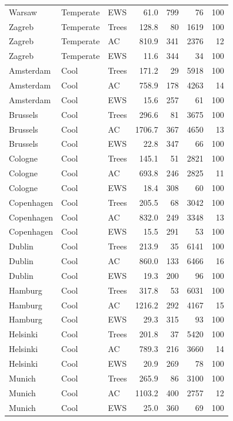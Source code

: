 \begin{table}[ht]
\begin{tabular}{lllrrrr}
  Warsaw & Temperate & EWS & 61.0 & 799 & 76 & 100 \\ 
  Zagreb & Temperate & Trees & 128.8 & 80 & 1619 & 100 \\ 
  Zagreb & Temperate & AC & 810.9 & 341 & 2376 & 12 \\ 
  Zagreb & Temperate & EWS & 11.6 & 344 & 34 & 100 \\ 
  Amsterdam & Cool & Trees & 171.2 & 29 & 5918 & 100 \\ 
  Amsterdam & Cool & AC & 758.9 & 178 & 4263 & 14 \\ 
  Amsterdam & Cool & EWS & 15.6 & 257 & 61 & 100 \\ 
  Brussels & Cool & Trees & 296.6 & 81 & 3675 & 100 \\ 
  Brussels & Cool & AC & 1706.7 & 367 & 4650 & 13 \\ 
  Brussels & Cool & EWS & 22.8 & 347 & 66 & 100 \\ 
  Cologne & Cool & Trees & 145.1 & 51 & 2821 & 100 \\ 
  Cologne & Cool & AC & 693.8 & 246 & 2825 & 11 \\ 
  Cologne & Cool & EWS & 18.4 & 308 & 60 & 100 \\ 
  Copenhagen & Cool & Trees & 205.5 & 68 & 3042 & 100 \\ 
  Copenhagen & Cool & AC & 832.0 & 249 & 3348 & 13 \\ 
  Copenhagen & Cool & EWS & 15.5 & 291 & 53 & 100 \\ 
  Dublin & Cool & Trees & 213.9 & 35 & 6141 & 100 \\ 
  Dublin & Cool & AC & 860.0 & 133 & 6466 & 16 \\ 
  Dublin & Cool & EWS & 19.3 & 200 & 96 & 100 \\ 
  Hamburg & Cool & Trees & 317.8 & 53 & 6031 & 100 \\ 
  Hamburg & Cool & AC & 1216.2 & 292 & 4167 & 15 \\ 
  Hamburg & Cool & EWS & 29.3 & 315 & 93 & 100 \\ 
  Helsinki & Cool & Trees & 201.8 & 37 & 5420 & 100 \\ 
  Helsinki & Cool & AC & 789.3 & 216 & 3660 & 14 \\ 
  Helsinki & Cool & EWS & 20.9 & 269 & 78 & 100 \\ 
  Munich & Cool & Trees & 265.9 & 86 & 3100 & 100 \\ 
  Munich & Cool & AC & 1103.2 & 400 & 2757 & 12 \\ 
  Munich & Cool & EWS & 25.0 & 360 & 69 & 100 \\ 

\end{tabular}
\end{table}
